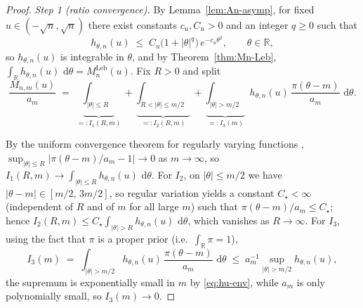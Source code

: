 \documentclass[12pt, a4paper]{report}
\newcommand{\dd}{\,\mathrm{d}}
\newcommand{\Leb}{\mathrm{Leb}}
\newcommand{\1}{\mathbf{1}}
\begin{document}
\begin{proof}
\emph{Step 1 (ratio convergence).} By Lemma~\ref{lem:An-asymp}, for fixed
$u\in(-\sqrt n,\sqrt n)$ there exist constants $c_u, C_u > 0$ and an integer
$q\geq 0$ such that
\begin{equation}\label{eq:hu-env}
  h_{\theta,n}(u)\;\leq\; C_u\bigl(1+|\theta|^q\bigr)\,e^{-c_u\theta^2},
  \qquad \theta\in\mathbb{R},
\end{equation}
so $h_{\theta,n}(u)$ is integrable in $\theta$, and by Theorem~\ref{thm:Mn-Leb},
$\int_\mathbb{R} h_{\theta,n}(u)\,\dd\theta = M_n^{\Leb}(u)$. Fix $R>0$ and split
\[
  \frac{M_{n,m}(u)}{a_m}
  \;=\;\underbrace{\int_{|\theta|\leq R}}_{=:I_1(R,m)}
   +\underbrace{\int_{R<|\theta|\leq m/2}}_{=:I_2(R,m)}
   +\underbrace{\int_{|\theta|>m/2}}_{=:I_3(m)}\;
   h_{\theta,n}(u)\,\frac{\pi(\theta-m)}{a_m}\,\dd\theta.
\]

By the uniform convergence theorem for regularly varying functions
\citep[Theorem~1.2.1]{Bingham1987}, $\sup_{|\theta|\leq R}|\pi(\theta-m)/a_m-1|\to 0$
as $m\to\infty$, so $I_1(R,m)\to\int_{|\theta|\leq R}h_{\theta,n}(u)\,\dd\theta$.
For $I_2$, on $|\theta|\leq m/2$ we have $|\theta-m|\in[m/2,\,3m/2]$, so
regular variation yields a constant $C_\star<\infty$ (independent of $R$ and of
$m$ for all large $m$) such that $\pi(\theta-m)/a_m\leq C_\star$; hence
$I_2(R,m)\leq C_\star\int_{|\theta|>R}h_{\theta,n}(u)\,\dd\theta$, which vanishes
as $R\to\infty$. For $I_3$, using the fact that $\pi$ is a proper prior
(i.e.\ $\int_\mathbb{R}\pi=1$),
\[
I_3(m)\;=\;\int_{|\theta|>m/2}h_{\theta,n}(u)\,\frac{\pi(\theta-m)}{a_m}\,\dd\theta
   \;\leq\; a_m^{-1}\sup_{|\theta|>m/2}h_{\theta,n}(u),
\]
the supremum is exponentially small in $m$ by \eqref{eq:hu-env}, while $a_m$ is
only polynomially small, so $I_3(m)\to 0$.


\end{proof}
\end{document}
